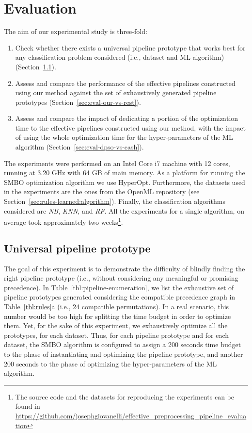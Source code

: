 \color{black}
\section{Evaluation}

\label{sec:evaluation}
The aim of our experimental study is three-fold:
\begin{enumerate}
    \item Check whether there exists a universal pipeline prototype that works best for any classification problem considered  (i.e., dataset and ML algorithm) (Section~\ref{sec:eval-universal-pipeline}).
    \item Assess and compare the performance of the effective pipelines constructed using our method against the set of exhaustively generated pipeline prototypes (Section~\ref{sec:eval-our-vs-rest}).
    \item Assess and compare the impact of dedicating a portion of the optimization time to the effective pipelines constructed using our method, with the impact of using the whole optimization time for the hyper-parameters of the ML algorithm (Section~\ref{sec:eval-dpso-vs-cash}).
\end{enumerate}

The experiments were performed on an Intel Core i7 machine with 12 cores, running at 3.20 GHz with 64 GB of main memory. As a platform for running the SMBO optimization algorithm we use HyperOpt. Furthermore, the datasets used in the experiments are the ones from the OpenML repository (see Section~\ref{sec:rules-learned:algorithm}). Finally, the classification algorithms considered are \textit{NB}, \textit{KNN}, and \textit{RF}. All the experiments for a single algorithm, on average took approximately two weeks\footnote{The source code and the datasets for reproducing the experiments can be found in 
\href{https://github.com/josephgiovanelli/effective\_preprocessing\_pipeline\_evaluation}{https://github.com/josephgiovanelli/effective\_preprocessing\_pipeline\_evaluation}}.

\subsection{Universal pipeline prototype}
\label{sec:eval-universal-pipeline}
The goal of this experiment is to demonstrate the difficulty of blindly finding the right pipeline prototype (i.e., without considering any meaningful or promising precedence).
In Table~\ref{tbl:pipeline-enumeration}, we list the exhaustive set of pipeline prototypes generated considering the compatible precedence graph in Table~\ref{tbl:rules}a (i.e., 24 compatible permutations). In a real scenario, this number would be too high for splitting the time budget in order to optimize them. 
Yet, for the sake of this experiment, we exhaustively optimize all the prototypes, for each dataset. Thus, for each pipeline prototype and for each dataset, the SMBO algorithm is configured to assign a 200 seconds time budget to the phase of instantiating and optimizing the pipeline prototype, and another 200 seconds to the phase of optimizing the hyper-parameters of the ML algorithm.

